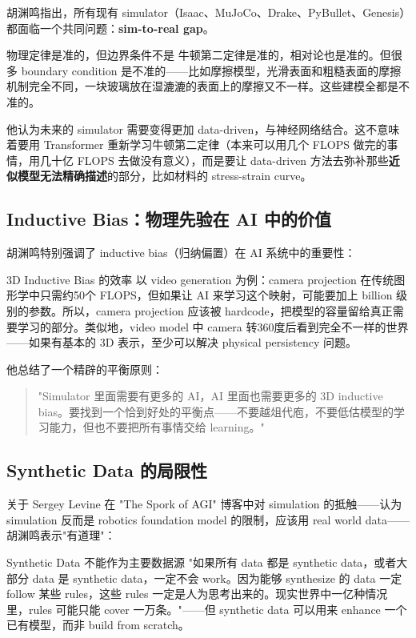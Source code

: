 胡渊鸣指出，所有现有 simulator（Isaac、MuJoCo、Drake、PyBullet、Genesis）都面临一个共同问题：\textbf{sim-to-real gap}。

\begin{warningbox}{物理定律是准的，但边界条件不是}
牛顿第二定律是准的，相对论也是准的。但很多 boundary condition 是不准的——比如摩擦模型，光滑表面和粗糙表面的摩擦机制完全不同，一块玻璃放在湿漉漉的表面上的摩擦又不一样。这些建模全都是不准的。
\end{warningbox}

他认为未来的 simulator 需要变得更加 data-driven，与神经网络结合。这不意味着要用 Transformer 重新学习牛顿第二定律（本来可以用几个 FLOPS 做完的事情，用几十亿 FLOPS 去做没有意义），而是要让 data-driven 方法去弥补那些\textbf{近似模型无法精确描述}的部分，比如材料的 stress-strain curve。

\subsection{Inductive Bias：物理先验在 AI 中的价值}

胡渊鸣特别强调了 inductive bias（归纳偏置）在 AI 系统中的重要性：

\begin{importantbox}{3D Inductive Bias 的效率}
以 video generation 为例：camera projection 在传统图形学中只需约50个 FLOPS，但如果让 AI 来学习这个映射，可能要加上 billion 级别的参数。所以，camera projection 应该被 hardcode，把模型的容量留给真正需要学习的部分。类似地，video model 中 camera 转360度后看到完全不一样的世界——如果有基本的 3D 表示，至少可以解决 physical persistency 问题。
\end{importantbox}

他总结了一个精辟的平衡原则：

\begin{quote}
"Simulator 里面需要有更多的 AI，AI 里面也需要更多的 3D inductive bias。要找到一个恰到好处的平衡点——不要越俎代庖，不要低估模型的学习能力，但也不要把所有事情交给 learning。"
\end{quote}

\subsection{Synthetic Data 的局限性}

关于 Sergey Levine 在 "The Spork of AGI" 博客中对 simulation 的抵触——认为 simulation 反而是 robotics foundation model 的限制，应该用 real world data——胡渊鸣表示"有道理"：

\begin{warningbox}{Synthetic Data 不能作为主要数据源}
"如果所有 data 都是 synthetic data，或者大部分 data 是 synthetic data，一定不会 work。因为能够 synthesize 的 data 一定 follow 某些 rules，这些 rules 一定是人为思考出来的。现实世界中一亿种情况里，rules 可能只能 cover 一万条。"——但 synthetic data 可以用来 enhance 一个已有模型，而非 build from scratch。
\end{warningbox}

